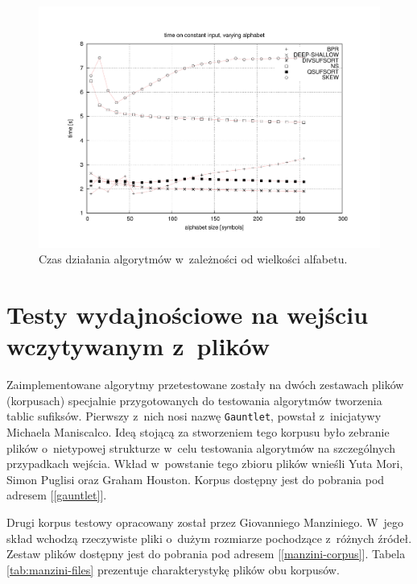 \begin{figure}[p]
       \begin{center}
            \includegraphics[width=\linewidth]{figures/results/random-alphabet-time.pdf}
        \end{center}        
    \caption{Czas działania algorytmów w~zależności od wielkości alfabetu.}%
    \label{rys:random-alphabet-time}
\end{figure}


\FloatBarrier

\section{Testy wydajnościowe na wejściu wczytywanym z~plików}

Zaimplementowane algorytmy przetestowane zostały na dwóch zestawach plików (korpusach) specjalnie
przygotowanych do testowania algorytmów tworzenia tablic sufiksów. Pierwszy z~nich nosi nazwę
\texttt{Gauntlet}, powstał z~inicjatywy Michaela Maniscalco. Ideą stojącą za stworzeniem tego
korpusu było zebranie plików o~nietypowej strukturze w~celu testowania algorytmów na szczególnych
przypadkach wejścia. Wkład w~powstanie tego zbioru plików wnieśli Yuta Mori, Simon Puglisi oraz
Graham Houston. Korpus dostępny jest do pobrania pod adresem [\ref{gauntlet}].

Drugi korpus testowy opracowany został przez Giovanniego Manziniego. W~jego skład wchodzą
rzeczywiste pliki o~dużym rozmiarze pochodzące z~różnych źródeł. Zestaw plików dostępny jest do
pobrania pod adresem [\ref{manzini-corpus}]. Tabela \ref{tab:manzini-files} prezentuje
charakterystykę plików obu korpusów.


